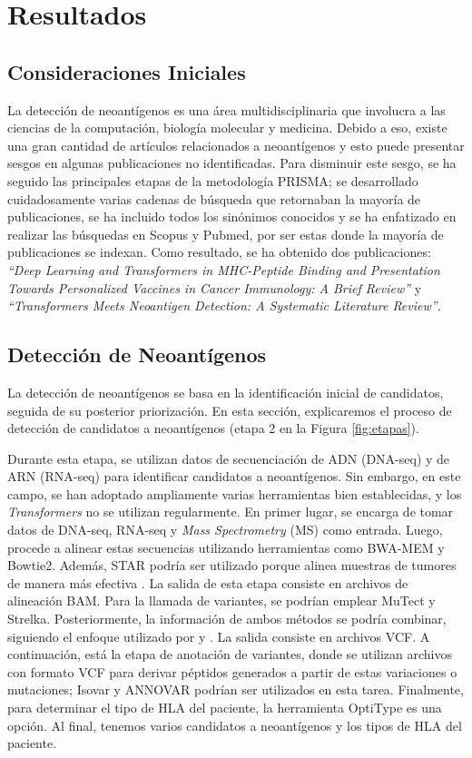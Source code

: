 \section{Resultados}

\subsection{Consideraciones Iniciales}

La detección de neoantígenos es una área multidisciplinaria que involucra a las ciencias de la computación, biología molecular y medicina. Debido a eso, existe una gran cantidad de artículos relacionados a neoantígenos y esto puede presentar sesgos en algunas publicaciones no identificadas. Para disminuir este sesgo, se ha seguido las principales etapas de la metodología PRISMA; se desarrollado cuidadosamente varias cadenas de búsqueda que retornaban la mayoría de publicaciones, se ha incluido todos los sinónimos conocidos y se ha enfatizado en realizar las búsquedas en Scopus y Pubmed, por ser estas donde la mayoría de publicaciones se indexan. Como resultado, se ha obtenido dos publicaciones: \textit{``Deep Learning and Transformers in MHC-Peptide Binding and Presentation Towards Personalized Vaccines in Cancer Immunology: A Brief Review''} \citep{machaca2023deep} y \textit{``Transformers Meets Neoantigen Detection: A Systematic Literature Review''}.

\subsection{Detección de Neoantígenos}

La detección de neoantígenos se basa en la identificación inicial de candidatos, seguida de su posterior priorización. En esta sección, explicaremos el proceso de detección de candidatos a neoantígenos (etapa 2 en la Figura \ref{fig:etapas}).

Durante esta etapa, se utilizan datos de secuenciación de ADN (DNA-seq) y de ARN (RNA-seq) para identificar candidatos a neoantígenos. Sin embargo, en este campo, se han adoptado ampliamente varias herramientas bien establecidas, y los \textit{Transformers} no se utilizan regularmente. En primer lugar, se encarga de tomar datos de DNA-seq, RNA-seq y \textit{Mass Spectrometry} (MS) como entrada. Luego, procede a alinear estas secuencias utilizando herramientas como BWA-MEM y Bowtie2. Además, STAR podría ser utilizado porque alinea muestras de tumores de manera más efectiva \citep{rubinsteyn2018computational}. La salida de esta etapa consiste en archivos de alineación BAM. Para la llamada de variantes, se podrían emplear MuTect y Strelka. Posteriormente, la información de ambos métodos se podría combinar, siguiendo el enfoque utilizado por \cite{zhou2021prioritizing} y \cite{rubinsteyn2018computational}. La salida consiste en archivos VCF. A continuación, está la etapa de anotación de variantes, donde se utilizan archivos con formato VCF para derivar péptidos generados a partir de estas variaciones o mutaciones; Isovar y ANNOVAR podrían ser utilizados en esta tarea. Finalmente, para determinar el tipo de HLA del paciente, la herramienta OptiType es una opción. Al final, tenemos varios candidatos a neoantígenos y los tipos de HLA del paciente.

